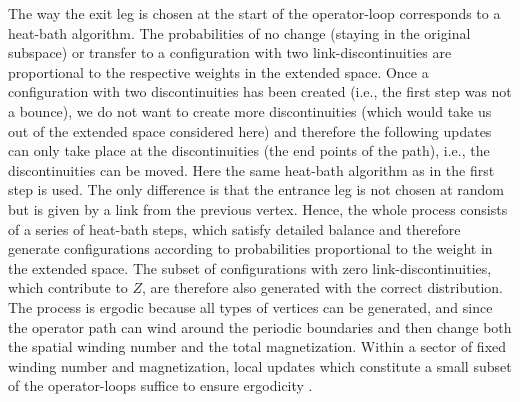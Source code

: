 \documentclass[10pt,pre,aps,twocolumn,showpacs,superscriptaddress,
floatfix]{revtex4}
\begin{document}
The way the exit leg is chosen at the start of the operator-loop corresponds 
to a heat-bath algorithm. The probabilities of no change (staying in the 
original subspace) or transfer to a configuration with two 
link-discontinuities are proportional to the respective weights in the 
extended space. Once a configuration with two discontinuities has been 
created (i.e., the first step was not a bounce), we do not want to create more 
discontinuities (which would take us out of the extended space considered 
here) and therefore the following updates can only take place at the 
discontinuities (the end points of the path), i.e., the discontinuities can 
be moved. Here the same heat-bath algorithm as in the first step is used. 
The only difference is that the entrance leg is not chosen at random but is 
given by a link from the previous vertex. Hence, the whole process consists 
of a series of heat-bath steps, which satisfy detailed balance and therefore 
generate configurations according to probabilities proportional to the weight 
in the extended space. The subset of configurations with zero 
link-discontinuities, which contribute to $Z$, are therefore also generated 
with the correct distribution. The process is ergodic because all types of 
vertices can be generated, and since the operator path can wind around the 
periodic boundaries and then change both the spatial winding number and the 
total magnetization. Within a sector of fixed winding number and 
magnetization, local updates which constitute a small subset of the 
operator-loops suffice to ensure ergodicity \cite{sse4}.
\end{document}
